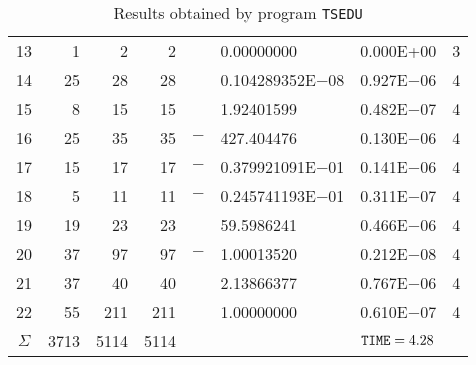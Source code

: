 \documentclass{esub2acm}
\begin{document}
\begin{table}
\begin{tabular}{c|rrrr@{}lcc}
13  &   1   &   2   &   2   &       &   0.00000000  &   0.000E+00   &   3   \\
14  &   25  &   28  &   28  &       &   0.104289352E$-$08   &   0.927E$-$06 &   4   \\
15  &   8   &   15  &   15  &       &   1.92401599  &   0.482E$-$07 &   4   \\
16  &   25  &   35  &   35  &   $-$ &   427.404476  &   0.130E$-$06 &   4   \\
17  &   15  &   17  &   17  &   $-$ &   0.379921091E$-$01   &   0.141E$-$06 &   4   \\
18  &   5   &   11  &   11  &   $-$ &   0.245741193E$-$01   &   0.311E$-$07 &   4   \\
19  &   19  &   23  &   23  &       &   59.5986241  &   0.466E$-$06 &   4   \\
20  &   37  &   97  &   97  &   $-$ &   1.00013520  &   0.212E$-$08 &   4   \\
21  &   37  &   40  &   40  &       &   2.13866377  &   0.767E$-$06 &   4   \\
22  &   55  &   211 &   211 &       &   1.00000000  &   0.610E$-$07 &   4   \\ \hline
$\Sigma$\rule[-2pt]{0pt}{12pt}  &   3713    &   5114    &   5114    &       &       &   ${\tt TIME} = 4.28$ &       \\ \hline
\end{tabular}
\caption{Results obtained by program {\tt TSEDU}}
\label{tsedu}
\end{table}
\end{document}
